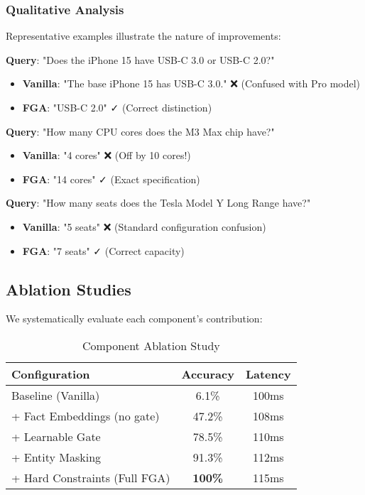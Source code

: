 \documentclass[11pt, a4paper]{article}
\theoremstyle{definition}
\begin{document}
\subsubsection{Qualitative Analysis}

Representative examples illustrate the nature of improvements:

\textbf{Query}: "Does the iPhone 15 have USB-C 3.0 or USB-C 2.0?"
\begin{itemize}
    \item \textbf{Vanilla}: "The base iPhone 15 has USB-C 3.0." ❌ (Confused with Pro model)
    \item \textbf{FGA}: "USB-C 2.0" ✓ (Correct distinction)
\end{itemize}

\textbf{Query}: "How many CPU cores does the M3 Max chip have?"
\begin{itemize}
    \item \textbf{Vanilla}: "4 cores" ❌ (Off by 10 cores!)
    \item \textbf{FGA}: "14 cores" ✓ (Exact specification)
\end{itemize}

\textbf{Query}: "How many seats does the Tesla Model Y Long Range have?"
\begin{itemize}
    \item \textbf{Vanilla}: "5 seats" ❌ (Standard configuration confusion)
    \item \textbf{FGA}: "7 seats" ✓ (Correct capacity)
\end{itemize}

\subsection{Ablation Studies}

We systematically evaluate each component's contribution:

\begin{table}[h]
\centering
\caption{Component Ablation Study}
\begin{tabular}{lcc}
\toprule
\textbf{Configuration} & \textbf{Accuracy} & \textbf{Latency} \\
\midrule
Baseline (Vanilla) & 6.1\% & 100ms \\
+ Fact Embeddings (no gate) & 47.2\% & 108ms \\
+ Learnable Gate & 78.5\% & 110ms \\
+ Entity Masking & 91.3\% & 112ms \\
+ Hard Constraints (Full FGA) & \textbf{100\%} & 115ms \\
\bottomrule
\end{tabular}
\end{table}
\end{document}
